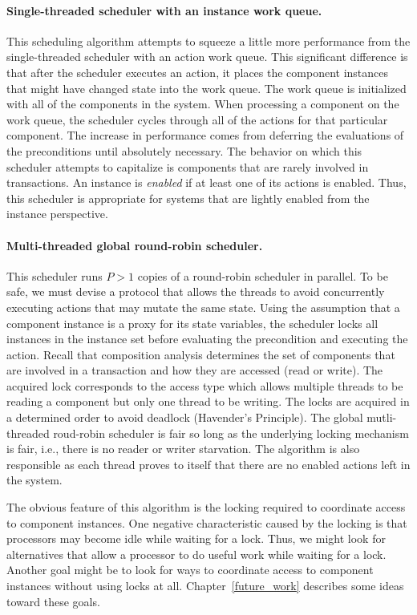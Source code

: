 \paragraph{Single-threaded scheduler with an instance work queue.}
This scheduling algorithm attempts to squeeze a little more performance from the single-threaded scheduler with an action work queue.
This significant difference is that after the scheduler executes an action, it places the component instances that might have changed state into the work queue.
The work queue is initialized with all of the components in the system.
When processing a component on the work queue, the scheduler cycles through all of the actions for that particular component.
The increase in performance comes from deferring the evaluations of the preconditions until absolutely necessary.
The behavior on which this scheduler attempts to capitalize is components that are rarely involved in transactions.
An instance is \emph{enabled} if at least one of its actions is enabled.
Thus, this scheduler is appropriate for systems that are lightly enabled from the instance perspective.

\paragraph{Multi-threaded global round-robin scheduler.}
This scheduler runs $P > 1$ copies of a round-robin scheduler in parallel.
To be safe, we must devise a protocol that allows the threads to avoid concurrently executing actions that may mutate the same state.
Using the assumption that a component instance is a proxy for its state variables, the scheduler locks all instances in the instance set before evaluating the precondition and executing the action.
Recall that composition analysis determines the set of components that are involved in a transaction and how they are accessed (read or write).
The acquired lock corresponds to the access type which allows multiple threads to be reading a component but only one thread to be writing.
The locks are acquired in a determined order to avoid deadlock (Havender's Principle).
The global mutli-threaded roud-robin scheduler is fair so long as the underlying locking mechanism is fair, i.e., there is no reader or writer starvation.
The algorithm is also responsible as each thread proves to itself that there are no enabled actions left in the system.

The obvious feature of this algorithm is the locking required to coordinate access to component instances.
One negative characteristic caused by the locking is that processors may become idle while waiting for a lock.
Thus, we might look for alternatives that allow a processor to do useful work while waiting for a lock.
Another goal might be to look for ways to coordinate access to component instances without using locks at all.
Chapter~\ref{future_work} describes some ideas toward these goals.

